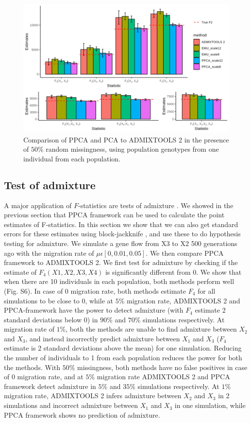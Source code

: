 \documentclass[12pt, letterpaper]{article}
\begin{document}
\begin{figure}[ht!]
    \includegraphics[width=16.5cm]{plots/simfiles/Ne1000/split_times1000/npop10_nind100/missing0.5/plots_8_12/mu0.05_plot_all_1ind_missing.png}
    \centering
    \caption{Comparison of PPCA and PCA to ADMIXTOOLS 2 in the presence of $50\%$ random missingness, using population genotypes from one individual from each population.}
    \label{fig:comparison-adm}
\end{figure}


\subsection{Test of admixture}
A major application of $F$-statistics are tests of admixture \cite{orlando_ancient_2021}. We showed in the previous section that PPCA framework can be used to calculate the point estimates of F-statistics. In this section we show that we can also get standard errors for these estimates using block-jackknife \cite{patterson_modication_nodate}, and use these to do hypothesis testing for admixture. We simulate a gene flow from X3 to X2 500 generations ago with the migration rate of $\mu \epsilon [0, 0.01, 0.05]$. We then compare PPCA framework to ADMIXTOOLS 2. We first test for admixture by checking if the estimate of $F_4(X1,X2,X3,X4)$ is significantly different from 0. We show that when there are 10 individuals in each population, both methods perform well (Fig. S6). In case of 0 migration rate, both methods estimate $F_4$ for all simulations to be close to 0, while at $5\%$ migration rate, ADMIXTOOLS 2 and PPCA-framework have the power to detect admixture (with $F_4$ estimate 2 standard deviations below 0) in $90\%$ and $70\%$ simulations respectively. At migration rate of $1\%$, both the methods are unable to find admixture between $X_2$ and $X_3$, and instead incorrectly predict admixture between $X_1$ and $X_3$ ($F_4$ estimate is 2 standard deviations above the mean) for one simulation. Reducing the number of individuals to 1 from each population reduces the power for both the methods. With $50\%$ missingness, both methods have no false positives in case of 0 migration rate, and at $5\%$ migration rate ADMIXTOOLS 2 and PPCA framework detect admixture in $5\%$ and $35\%$ simulations respectively. At $1\%$ migration rate, ADMIXTOOLS 2 infers admixture between $X_2$ and $X_3$ in 2 simulations and incorrect admixture between $X_1$ and $X_3$ in one simulation, while PPCA framework shows no prediction of admixture.
\end{document}
